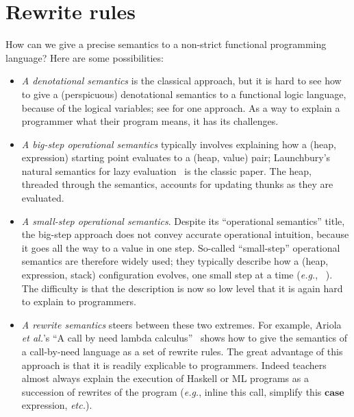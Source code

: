\documentclass[acmsmall,review,dvipsnames]{acmart}
\newcommand{\eg}{\emph{e.g.}}
\newcommand{\etc}{\emph{etc.}}
\newcommand{\etal}{\emph{et al.}}
\begin{document}
\section{Rewrite rules} \label{sec:rewrite-rules}

How can we give a precise semantics to a non-strict functional
programming language?  Here are some possibilities:
\begin{itemize}
\item \emph{A denotational semantics} is the classical approach,
  but it is hard to see how to give a (perspicuous) denotational semantics to a functional logic language,
  because of the logical variables; see \cite{christiansen:denotational} for one approach.
  As a way to explain a programmer what their program means, it has its challenges.
\item \emph{A big-step operational semantics} typically involves explaining how a (heap, expression) starting point
  evaluates to a (heap, value) pair; Launchbury's natural semantics for lazy evaluation~\cite{launchbury:natural} is the classic paper.  The heap, threaded through the semantics, accounts for updating thunks as they are evaluated.
\item \emph{A small-step operational semantics}. Despite its ``operational semantics'' title, the big-step approach
  does not convey accurate operational intuition, because it goes all the way to a value
  in one step. So-called ``small-step'' operational semantics are therefore widely used;
  they typically describe how a (heap, expression, stack) configuration evolves, one small
  step at a time ({\eg}, ~\cite{pj:stg-machine}).
  The difficulty is that the description is now so low level that it is again hard to explain to programmers.
\item \emph{A rewrite semantics} steers between these two extremes.
  For example, Ariola {\etal}'s ``A call by need lambda calculus''~\cite{ariola:call-by-need} shows how
  to give the semantics of a call-by-need language as a set of rewrite rules. The great
  advantage of this approach is that it is readily explicable to programmers.
  Indeed teachers almost always explain the execution of Haskell or ML programs as a succession of rewrites
 of the program ({\eg}, inline this call, simplify this \ensuremath{\textbf{case}} expression, \etc).
\end{itemize}
\end{document}
